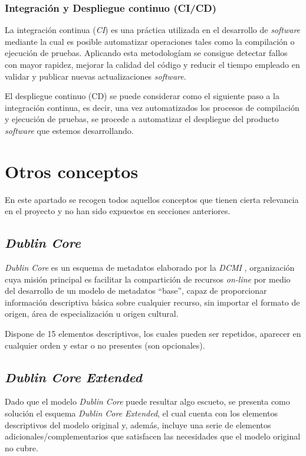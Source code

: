 \subsubsection{Integración y Despliegue continuo (CI/CD)}

La integración continua (\emph{CI}) es una práctica utilizada en el desarrollo
de \emph{software} mediante la cual es posible automatizar operaciones
tales como la compilación o ejecución de pruebas. Aplicando esta
metodologíam se consigue detectar fallos con mayor rapidez, mejorar la
calidad del código y reducir el tiempo empleado en validar y
publicar nuevas actualizaciones \emph{software}.

El despliegue continuo (CD) se puede considerar como el siguiente paso a
la integración continua, es decir, una vez automatizados los procesos de
compilación y ejecución de pruebas, se procede a automatizar el
despliegue del producto \emph{software} que estemos desarrollando.

\section{Otros conceptos}

En este apartado se recogen todos aquellos conceptos que tienen cierta
relevancia en el proyecto y no han sido expuestos en secciones
anteriores.

\subsection{\emph{Dublin Core}}

\emph{Dublin Core} es un esquema de metadatos elaborado por la
\emph{DCMI} \cite{dc:web}, organización cuya misión
principal es facilitar la compartición de recursos \emph{on-line} por
medio del desarrollo de un modelo de metadatos ``base'', capaz de
proporcionar información descriptiva básica sobre cualquier recurso, sin
importar el formato de origen, área de especialización u origen
cultural. 

Dispone de 15 elementos descriptivos, los cuales pueden ser
repetidos, aparecer en cualquier orden y estar o no presentes
(son opcionales).

\subsection{\emph{Dublin Core Extended}}

Dado que el modelo \emph{Dublin Core} puede resultar algo escueto, se
presenta como solución el esquema \emph{Dublin Core Extended}, el cual
cuenta con los elementos descriptivos del modelo original y, además,
incluye una serie de elementos adicionales/complementarios \cite{dcterms:web}
que satisfacen las necesidades que el modelo original no cubre.

